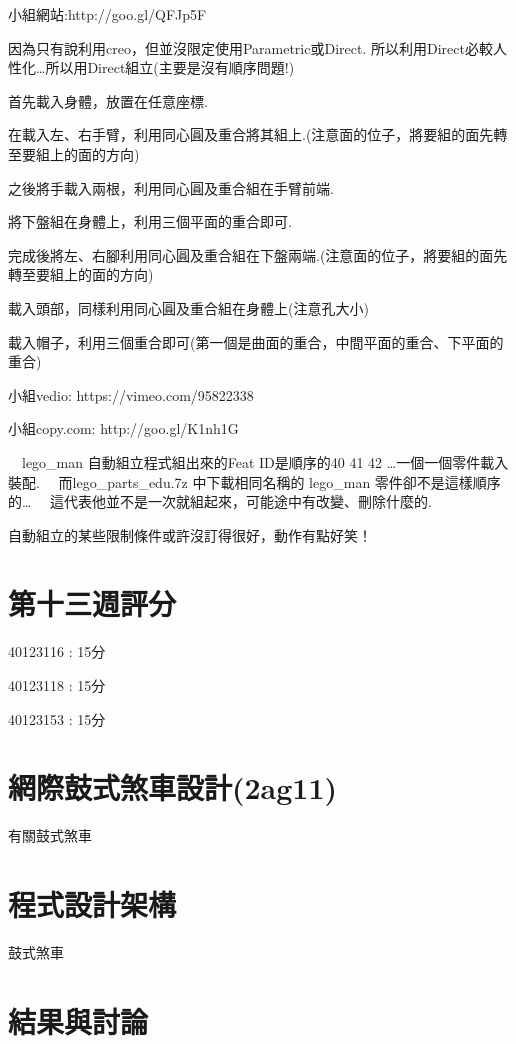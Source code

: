 \documentclass[]{article}
\begin{document}
小組網站:http://goo.gl/QFJp5F

因為只有說利用creo，但並沒限定使用Parametric或Direct.
所以利用Direct必較人性化\ldots{}所以用Direct組立(主要是沒有順序問題!)

首先載入身體，放置在任意座標.

在載入左、右手臂，利用同心圓及重合將其組上.(注意面的位子，將要組的面先轉至要組上的面的方向)

之後將手載入兩根，利用同心圓及重合組在手臂前端.

將下盤組在身體上，利用三個平面的重合即可.

完成後將左、右腳利用同心圓及重合組在下盤兩端.(注意面的位子，將要組的面先轉至要組上的面的方向)

載入頭部，同樣利用同心圓及重合組在身體上(注意孔大小)

載入帽子，利用三個重合即可(第一個是曲面的重合，中間平面的重合、下平面的重合)

小組vedio: https://vimeo.com/95822338

小組copy.com: http://goo.gl/K1nh1G

　lego\_man 自動組立程式組出來的Feat ID是順序的40 41 42
\ldots{}一個一個零件載入裝配. 　而lego\_parts\_edu.7z 中下載相同名稱的
lego\_man 零件卻不是這樣順序的\ldots{}
　這代表他並不是一次就組起來，可能途中有改變、刪除什麼的.

自動組立的某些限制條件或許沒訂得很好，動作有點好笑！

\section{第十三週評分}\label{ux7b2cux5341ux4e09ux9031ux8a55ux5206}

40123116 : 15分

40123118 : 15分

40123153 : 15分

\section{網際鼓式煞車設計(2ag11)}\label{ux7db2ux969bux9f13ux5f0fux715eux8ecaux8a2dux8a082ag11}

有關鼓式煞車

\section{程式設計架構}\label{ux7a0bux5f0fux8a2dux8a08ux67b6ux69cb-6}

鼓式煞車

\section{結果與討論}\label{ux7d50ux679cux8207ux8a0eux8ad6-6}
\end{document}
